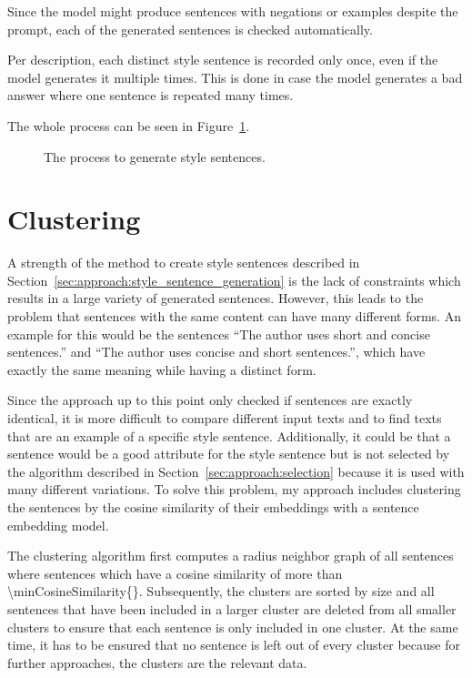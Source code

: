 Since the model might produce sentences with negations or examples despite the prompt, each of the generated sentences is checked automatically.

Per description, each distinct style sentence is recorded only once, even if the model generates it multiple times. This is done in case the model generates a bad answer where one sentence is repeated many times.

The whole process can be seen in Figure~\ref{fig:style_sentence_generation}.

\begin{figure}[ht]
  
  \caption{The process to generate style sentences.}
  \label{fig:style_sentence_generation}
\end{figure}


\section{Clustering}
\label{sec:approach:clustering}
A strength of the method to create style sentences described in Section~\ref{sec:approach:style_sentence_generation} is the lack of constraints which results in a large variety of generated sentences. However, this leads to the problem that sentences with the same content can have many different forms. An example for this would be the sentences \enquote{The author uses short and concise sentences.} and \enquote{The author uses concise and short sentences.}, which have exactly the same meaning while having a distinct form.

Since the approach up to this point only checked if sentences are exactly identical, it is more difficult to compare different input texts and to find texts that are an example of a specific style sentence. Additionally, it could be that a sentence would be a good attribute for the style sentence but is not selected by the algorithm described in Section~\ref{sec:approach:selection} because it is used with many different variations.
To solve this problem, my approach includes clustering the sentences by the cosine similarity of their embeddings with a sentence embedding model. %

The clustering algorithm first computes a radius neighbor graph of all sentences where sentences which have a cosine similarity of more than \num{\minCosineSimilarity{}}. Subsequently, the clusters are sorted by size and all sentences that have been included in a larger cluster are deleted from all smaller clusters to ensure that each sentence is only included in one cluster. At the same time, it has to be ensured that no sentence is left out of every cluster because for further approaches, the clusters are the relevant data.

